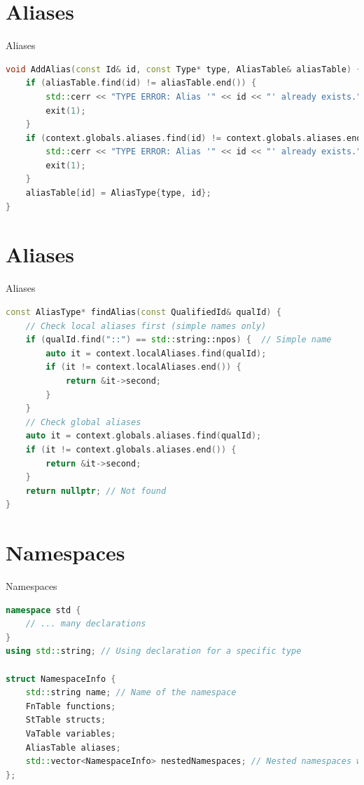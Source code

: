 \documentclass{beamer}
\begin{document}
\section{Aliases}
\begin{frame}[fragile]{Aliases}
\begin{lstlisting}[language=C++]
void AddAlias(const Id& id, const Type* type, AliasTable& aliasTable) { // called whenever typedef or using is used
    if (aliasTable.find(id) != aliasTable.end()) {
        std::cerr << "TYPE ERROR: Alias '" << id << "' already exists." << std::endl;
        exit(1);
    }
    if (context.globals.aliases.find(id) != context.globals.aliases.end()) {
        std::cerr << "TYPE ERROR: Alias '" << id << "' already exists." << std::endl;
        exit(1);
    }
    aliasTable[id] = AliasType{type, id};
}
\end{lstlisting}
\end{frame}
\section{Aliases}
\begin{frame}[fragile]{Aliases}
\begin{lstlisting}[language=C++]
const AliasType* findAlias(const QualifiedId& qualId) {
    // Check local aliases first (simple names only)
    if (qualId.find("::") == std::string::npos) {  // Simple name
        auto it = context.localAliases.find(qualId);
        if (it != context.localAliases.end()) {
            return &it->second;
        }
    }
    // Check global aliases
    auto it = context.globals.aliases.find(qualId);
    if (it != context.globals.aliases.end()) {
        return &it->second;
    }
    return nullptr; // Not found
}
\end{lstlisting}
\end{frame}
\section{Namespaces}
\begin{frame}[fragile]{Namespaces}
\begin{lstlisting}[language=C++]
namespace std {
    // ... many declarations
}
using std::string; // Using declaration for a specific type

struct NamespaceInfo {
    std::string name; // Name of the namespace
    FnTable functions;
    StTable structs;
    VaTable variables;
    AliasTable aliases;
    std::vector<NamespaceInfo> nestedNamespaces; // Nested namespaces within this namespace
};
\end{lstlisting}
\end{frame}
\end{document}

